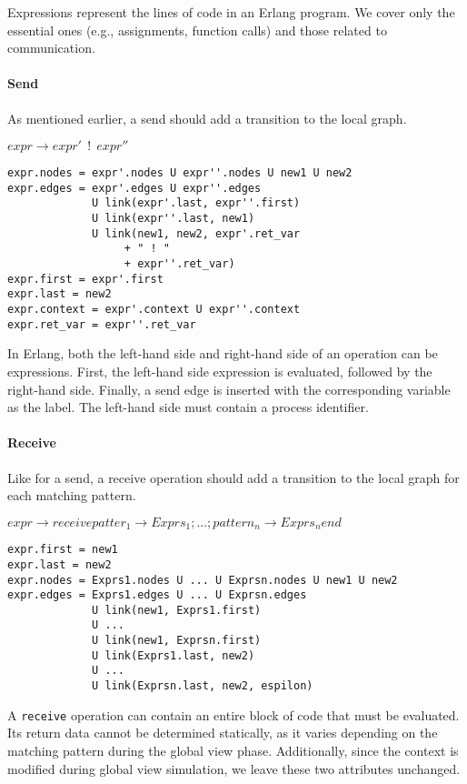 Expressions represent the lines of code in an Erlang program.  
We cover only the essential ones (e.g., assignments, function calls)  
and those related to communication.  

\paragraph{Send}   
As mentioned earlier, a send should add a transition to the local graph.  

\bigskip

\noindent $expr \to expr'\ \ !\ \ expr''$

\begin{verbatim}
expr.nodes = expr'.nodes U expr''.nodes U new1 U new2
expr.edges = expr'.edges U expr''.edges
             U link(expr'.last, expr''.first)
             U link(expr''.last, new1)
             U link(new1, new2, expr'.ret_var 
                  + " ! " 
                  + expr''.ret_var)
expr.first = expr'.first
expr.last = new2
expr.context = expr'.context U expr''.context
expr.ret_var = expr''.ret_var
\end{verbatim}

In Erlang, both the left-hand side and right-hand side of an operation  
can be expressions. First, the left-hand side expression is evaluated,  
followed by the right-hand side. Finally, a send edge is inserted with  
the corresponding variable as the label. The left-hand side must contain  
a process identifier.  

\paragraph{Receive}  
Like for a send, a receive operation should add a transition to  
the local graph for each matching pattern.  

\bigskip

\noindent $expr \to receive patter_1 \to Exprs_1; ...; pattern_n \to Exprs_n end$

\begin{verbatim}
expr.first = new1
expr.last = new2
expr.nodes = Exprs1.nodes U ... U Exprsn.nodes U new1 U new2
expr.edges = Exprs1.edges U ... U Exprsn.edges
             U link(new1, Exprs1.first) 
             U ...
             U link(new1, Exprsn.first)
             U link(Exprs1.last, new2)
             U ...
             U link(Exprsn.last, new2, espilon)
\end{verbatim}

A \texttt{receive} operation can contain an entire block of code 
that must be evaluated.  
Its return data cannot be determined statically, as it varies depending  
on the matching pattern during the global view phase. Additionally,  
since the context is modified during global view simulation,  
we leave these two attributes unchanged.  

